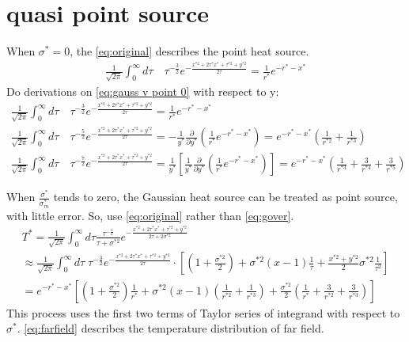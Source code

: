 \documentclass[review, 1p, number, sort&compress,table]{elsarticle}
\begin{document}
	\section{quasi point source}
		When $\sigma^{*}=0$, the  \autoref{eq:original} describes the point heat source.
		\begin{eqnarray}\label{eq:gauss v point 0}
		\frac{1}{\sqrt{2\pi}}\int_{0}^{\infty}{d\tau}\quad \tau^{-\frac{3}{2}}e^{-\frac{x^{*2}+2\tau^*x^{*}+\tau^{*2}+y^{*2}}{2\tau}} = \frac{1}{r^{*}}e^{-r^{*}-x^{*}}
		\end{eqnarray}
	Do derivations on \autoref{eq:gauss v point 0} with respect to y:
		\begin{eqnarray}\label{eq:gauss v point}
		\frac{1}{\sqrt{2\pi}}\int_{0}^{\infty}{d\tau}\quad \tau^{-\frac{3}{2}}e^{-\frac{x^{*2}+2\tau^*x^{*}+\tau^{*2}+y^{*2}}{2\tau}} = \frac{1}{r^{*}}e^{-r^{*}-x^{*}} \label{eq:gauss v point 1}
		\\
		\frac{1}{\sqrt{2\pi}}\int_{0}^{\infty}{d\tau}\quad \tau^{-\frac{5}{2}}e^{-\frac{x^{*2}+2\tau^*x^{*}+\tau^{*2}+y^{*2}}{2\tau}} = -\frac{1}{y^{*}}  \frac{\partial}{\partial y^{*}}\left(\frac{1}{r^{*}}e^{-r^{*}-x^{*}}\right)=e^{-r^{*}-x^{*}}\left(\frac{1}{r^{*2}}+\frac{1}{r^{*3}}\right)  \label{eq:gauss v point 2}
		\\
		\frac{1}{\sqrt{2\pi}}\int_{0}^{\infty}{d\tau}\quad \tau^{-\frac{7}{2}}e^{-\frac{x^{*2}+2\tau^*x^{*}+\tau^{*2}+y^{*2}}{2\tau}} =\frac{1}{y^{*}}  \left[\frac{1}{y^{*}}  \frac{\partial}{\partial y^{*}}\left(\frac{1}{r^{*}}e^{-r^{*}-x^{*}}\right)\right] =e^{-r^{*}-x^{*}}\left(\frac{1}{r^{*3}}+\frac{3}{r^{*4}} +\frac{3}{r^{*5}}\right) \label{eq:gauss v point 3}
		\end{eqnarray}
		
	When $\frac{\sigma^{*}}{\sigma^{*}_m}$ tends to zero, the Gaussian heat source can be treated as point source, with little error. So, use \autoref{eq:original} rather than \autoref{eq:gover}.
		\begin{eqnarray}  \label{eq:farfield}
			\nonumber
		T^*=\frac{1}{\sqrt{2\pi}}\int_{0}^{\infty}{d\tau}\frac{\tau^{-\frac{1}{2}}}{\tau+\sigma^{*2}}e^{-\frac{x^{*2}+2\tau^*x^{*}+\tau^{*2}+y^{*2}}{2\tau+2\sigma^{*2}}}
		\\ \nonumber
			\approx \frac{1}{\sqrt{2\pi}}\int_{0}^{\infty}{d\tau}\;{\tau^{-\frac{3}{2}}}e^{-\frac{x^{*2}+2\tau^*x^{*}+\tau^{*2}+y^{*2}}{2\tau}} \cdot \left[ \left(1+\frac{\sigma^{*2}}{2} \right)   +\sigma^{*2}\left(x-1\right)\frac{1}{\tau}   +\frac{x^{*2}+y^{*2}}{2}\sigma^{*2}\frac{1}{\tau^2}\right]
		\\ 
			= e^{-r^{*}-x^{*}}\left[ \left(1+\frac{\sigma^{*2}}{2} \right)  \frac{1}{r^{*}} +\sigma^{*2}\left(x-1\right) \left(\frac{1}{r^{*2}}+\frac{1}{r^{*3}}\right)
			 +\frac{\sigma^{*2}}{2}\left(\frac{1}{r^{*}}+\frac{3}{r^{*2}} +\frac{3}{r^{*3}}\right)\right]
		\end{eqnarray}
		This process uses the first two terms of Taylor series of integrand with respect to $\sigma^{*}$. \autoref{eq:farfield} describes the temperature distribution of far field.
\end{document}
